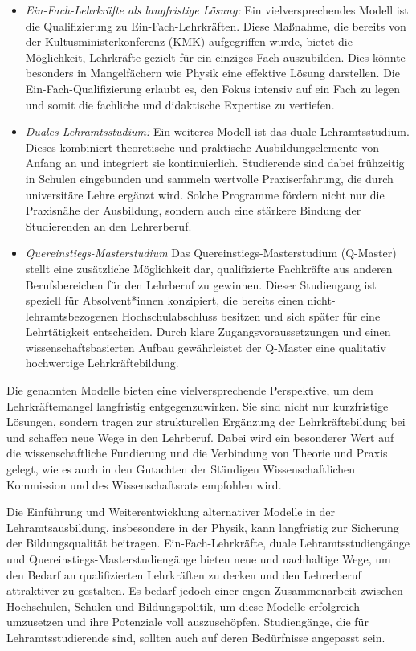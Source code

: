 \documentclass[DIV=calc]{scrartcl}
\begin{document}
\begin{itemize}
    \item \textit{Ein-Fach-Lehrkräfte als langfristige Lösung:} Ein vielversprechendes Modell ist die Qualifizierung zu Ein-Fach-Lehrkräften. Diese Maßnahme, die bereits von der Kultusministerkonferenz (KMK) aufgegriffen wurde, bietet die Möglichkeit, Lehrkräfte gezielt für ein einziges Fach auszubilden. Dies könnte besonders in Mangelfächern wie Physik eine effektive Lösung darstellen. Die Ein-Fach-Qualifizierung erlaubt es, den Fokus intensiv auf ein Fach zu legen und somit die fachliche und didaktische Expertise zu vertiefen.

    \item \textit{Duales Lehramtsstudium:} Ein weiteres Modell ist das duale Lehramtsstudium. Dieses kombiniert theoretische und praktische Ausbildungselemente von Anfang an und integriert sie kontinuierlich. Studierende sind dabei frühzeitig in Schulen eingebunden und sammeln wertvolle Praxiserfahrung, die durch universitäre Lehre ergänzt wird. Solche Programme fördern nicht nur die Praxisnähe der Ausbildung, sondern auch eine stärkere Bindung der Studierenden an den Lehrerberuf.

    \item \textit{Quereinstiegs-Masterstudium} Das Quereinstiegs-Masterstudium (Q-Master) stellt eine zusätzliche Möglichkeit dar, qualifizierte Fachkräfte aus anderen Berufsbereichen für den Lehrberuf zu gewinnen. Dieser Studiengang ist speziell für Absolvent*innen konzipiert, die bereits einen nicht-lehramtsbezogenen Hochschulabschluss besitzen und sich später für eine Lehrtätigkeit entscheiden. Durch klare Zugangsvoraussetzungen und einen wissenschaftsbasierten Aufbau gewährleistet der Q-Master eine qualitativ hochwertige Lehrkräftebildung.  
\end{itemize}

Die genannten Modelle bieten eine vielversprechende Perspektive, um dem Lehrkräftemangel langfristig entgegenzuwirken. Sie sind nicht nur kurzfristige Lösungen, sondern tragen zur strukturellen Ergänzung der Lehrkräftebildung bei und schaffen neue Wege in den Lehrberuf. Dabei wird ein besonderer Wert auf die wissenschaftliche Fundierung und die Verbindung von Theorie und Praxis gelegt, wie es auch in den Gutachten der Ständigen Wissenschaftlichen Kommission und des Wissenschaftsrats empfohlen wird.
    
Die Einführung und Weiterentwicklung alternativer Modelle in der Lehramtsausbildung, insbesondere in der Physik, kann langfristig zur Sicherung der Bildungsqualität beitragen. Ein-Fach-Lehrkräfte, duale Lehramtsstudiengänge und Quereinstiegs-Masterstudiengänge bieten neue und nachhaltige Wege, um den Bedarf an qualifizierten Lehrkräften zu decken und den Lehrerberuf attraktiver zu gestalten. Es bedarf jedoch einer engen Zusammenarbeit zwischen Hochschulen, Schulen und Bildungspolitik, um diese Modelle erfolgreich umzusetzen und ihre Potenziale voll auszuschöpfen. 
Studiengänge, die für Lehramtsstudierende sind, sollten auch auf deren Bedürfnisse angepasst sein.\\
\end{document}

